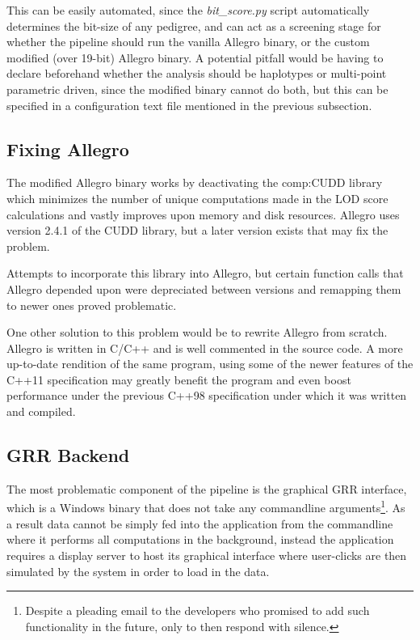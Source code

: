 This can be easily automated, since the \textit{bit\_score.py} script automatically determines the bit-size of any pedigree, and can act as a screening stage for whether the pipeline should run the vanilla Allegro binary, or the custom modified (over 19-bit) Allegro binary. A potential pitfall would be having to declare beforehand whether the analysis should be haplotypes or multi-point parametric driven, since the modified binary cannot do both, but this can be specified in a configuration text file mentioned in the previous subsection.

\subsection{Fixing Allegro}

The modified Allegro binary works by deactivating the \gls{comp:CUDD} library which minimizes the number of unique computations made in the LOD score calculations and vastly improves upon memory and disk resources. Allegro uses version 2.4.1 of the CUDD library, but a later version exists that may fix the problem.

Attempts to incorporate this library into Allegro, but certain function calls that Allegro depended upon were depreciated between versions and remapping them to newer ones proved problematic. 

One other solution to this problem would be to rewrite Allegro from scratch. Allegro is written in C/C++ and is well commented in the source code. A more up-to-date rendition of the same program, using some of the newer features of the C++11 specification \cite{c++2011iso} may greatly benefit the program and even boost performance under the previous C++98 specification under which it was written and compiled.

\subsection{GRR Backend}

The most problematic component of the pipeline is the graphical GRR interface, which is a Windows binary that does not take any commandline arguments\footnote{Despite a pleading email to the developers who promised to add such functionality in the future, only to then respond with silence.}. As a result data cannot be simply fed into the application from the commandline where it performs all computations in the background, instead the application requires a display server to host its graphical interface where user-clicks are then simulated by the system in order to load in the data.


